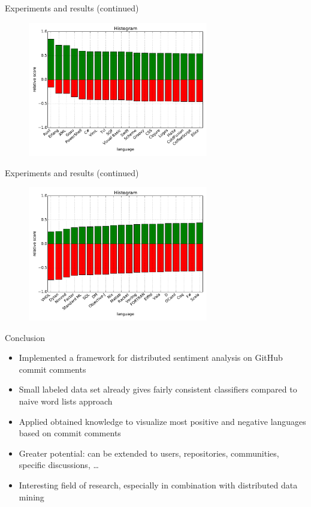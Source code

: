 \documentclass[t,11pt]{beamer}
\begin{document}
\begin{frame}[fragile]{Experiments and results (continued)}
  \begin{figure}
    \centering
    \includegraphics[width=0.7\textwidth]{../plots/all-language-PassiveAggressive-pos.pdf}
  \end{figure}
\end{frame}

\begin{frame}[fragile]{Experiments and results (continued)}
  \begin{figure}
    \centering
    \includegraphics[width=0.7\textwidth]{../plots/all-language-PassiveAggressive-neg.pdf}
  \end{figure}
\end{frame}

\begin{frame}[fragile]{Conclusion}
\begin{itemize}
  \item Implemented a framework for distributed sentiment analysis on GitHub 
    commit comments
  \item Small labeled data set already gives fairly consistent classifiers 
    compared to naive word lists approach
  \item Applied obtained knowledge to visualize most positive and negative 
    languages based on commit comments
  \item Greater potential: can be extended to users, repositories, communities, 
    specific discussions, \ldots
  \item Interesting field of research, especially in combination with 
    distributed data mining
\end{itemize}
\end{frame}
\end{document}
